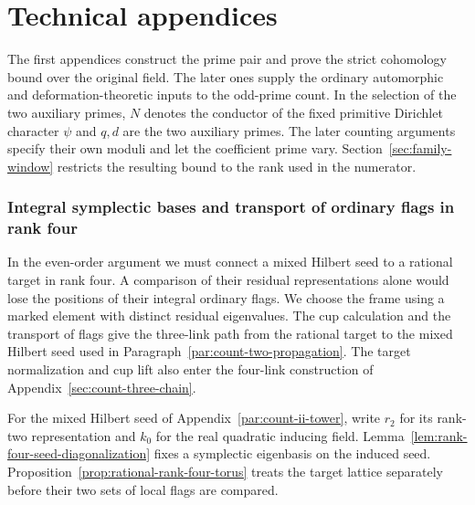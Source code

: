 \clearpage
\appendix
\begingroup
\makeatletter
{}
\makeatother
\newcommand{\G}{G_{\mathcal F}}
\newcommand{\Ima}{\operatorname{Im}}
\setlength{\emergencystretch}{2em}

\part*{Technical appendices}
{}

The first appendices construct the prime pair and prove the
strict cohomology bound over the original field. The later
ones supply the ordinary automorphic and deformation-theoretic
inputs to the odd-prime count. In the selection of the two auxiliary primes, \(N\) denotes the conductor of the fixed primitive Dirichlet character \(\psi\) and \(q,d\) are the two auxiliary primes. The later
counting arguments specify their own moduli and let the
coefficient prime vary. Section~\ref{sec:family-window}
restricts the resulting bound to the rank used in the numerator.















\section{Integral symplectic bases and transport of ordinary flags in rank four}
\label{sec:additional-rank-four}
In the even-order argument we must connect a mixed Hilbert seed to a rational target
in rank four. A comparison of their residual representations alone would lose the
positions of their integral ordinary flags. We choose the frame using a marked element
with distinct residual eigenvalues. The cup calculation and
the transport of flags give the three-link path from the
rational target to the mixed Hilbert seed used in
Paragraph~\ref{par:count-two-propagation}. The target normalization
and cup lift also enter the four-link construction of
Appendix~\ref{sec:count-three-chain}.

For the mixed Hilbert seed of Appendix~\ref{par:count-ii-tower},
write \(r_2\) for its rank-two representation and \(k_0\)
for the real quadratic inducing field. Lemma~\ref{lem:rank-four-seed-diagonalization} fixes a symplectic eigenbasis on the induced seed. Proposition~\ref{prop:rational-rank-four-torus} treats the target lattice separately before their two sets of local flags are compared.

